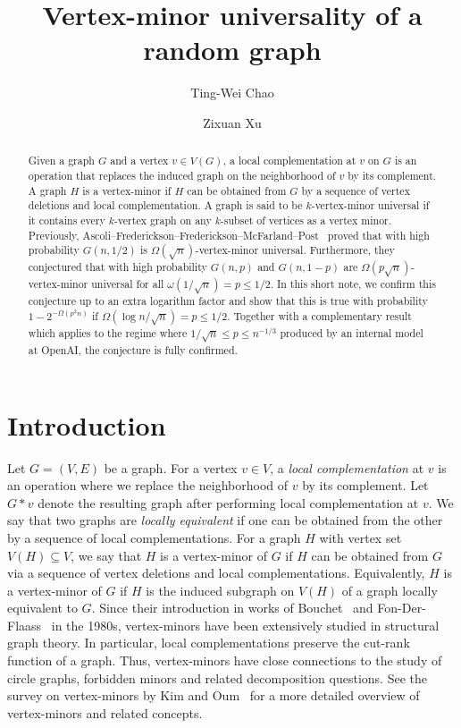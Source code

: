 \documentclass[reqno]{amsart}
\title
{Vertex-minor universality of a random graph}
\author[Ting-Wei Chao]{Ting-Wei Chao\thankssymb{1}}
\author[Zixuan Xu]{Zixuan Xu\thankssymb{1}}
\theoremstyle{definition}
\numberwithin{theorem}{section}
\renewcommand{\le}{\leqslant}
\begin{document}
\begin{abstract}
    Given a graph $G$ and a vertex $v\in V(G)$, a local complementation at $v$ on $G$ is an operation that replaces the induced graph on the neighborhood of $v$ by its complement. A graph $H$ is a vertex-minor if $H$ can be obtained from $G$ by a sequence of vertex deletions and local complementation. A graph is said to be $k$-vertex-minor universal if it contains every $k$-vertex graph on any $k$-subset of vertices as a vertex minor. Previously, Ascoli--Frederickson--Frederickson--McFarland--Post~\cite{AFFMP26} proved that with high probability $G(n,1/2)$ is $\Omega(\sqrt{n})$-vertex-minor universal. Furthermore, they conjectured that with high probability $G(n,p)$ and $G(n,1-p)$ are $\Omega(p\sqrt{n})$-vertex-minor universal for all $\omega(1/\sqrt{n})= p\le 1/2$. In this short note, we confirm this conjecture up to an extra logarithm factor and show that this is true with probability $1-2^{-\Omega(p^2n)}$ if $\Omega(\log n/\sqrt{n})= p\le 1/2$. 
    Together with a complementary result which applies to the regime where $1/\sqrt{n}\le p\le n^{-1/3}$ produced by an internal model at OpenAI, the conjecture is fully confirmed.
    
\end{abstract}

\maketitle

\section{Introduction}


Let $G = (V,E)$ be a graph. For a vertex $v\in V$, a \emph{local complementation} at $v$ is an operation where we replace the neighborhood of $v$ by its complement. Let $G * v$ denote the resulting graph after performing local complementation at $v$. We say that two graphs are \emph{locally equivalent} if one can be obtained from the other by a sequence of local complementations. For a graph $H$ with vertex set $V(H)\subseteq V$, we say that $H$ is a vertex-minor of $G$ if $H$ can be obtained from $G$ via a sequence of vertex deletions and local complementations. Equivalently, $H$ is a vertex-minor of $G$ if $H$ is the induced subgraph on $V(H)$ of a graph locally equivalent to $G$. Since their introduction in works of Bouchet~\cite{Bouchet1988Isotropic} and Fon-Der-Flaass~\cite{FonDerFlaass1988Local} in the 1980s, vertex-minors have been extensively studied in structural graph theory. In particular, local complementations preserve the cut-rank function of a graph. Thus, vertex-minors have close connections to the study of circle graphs, forbidden minors and related decomposition questions. See the survey on vertex-minors by Kim and Oum~\cite{KimOum2024VertexMinorsSurvey} for a more detailed overview of vertex-minors and related concepts.
\end{document}
